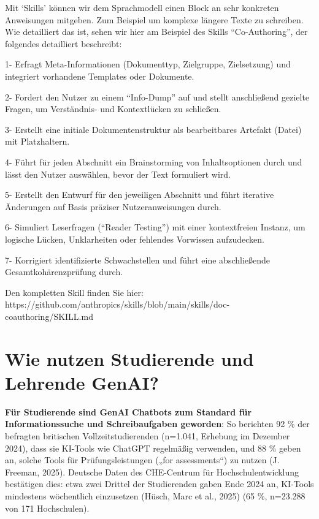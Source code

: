 \documentclass[
  ngerman,
  letterpaper,
  DIV=11]{scrreprt}
\begin{document}
\begin{tcolorbox}[enhanced jigsaw, left=2mm, bottomrule=.15mm, arc=.35mm, rightrule=.15mm, colframe=quarto-callout-tip-color-frame, coltitle=black, colback=white, toprule=.15mm, toptitle=1mm, colbacktitle=quarto-callout-tip-color!10!white, title=\textcolor{quarto-callout-tip-color}{\faLightbulb}\hspace{0.5em}{`I know Kung-Fu now' - modular Wissen hinzubuchen über `Skills'}, opacitybacktitle=0.6, leftrule=.75mm, bottomtitle=1mm, titlerule=0mm, opacityback=0, breakable]

Mit `Skills' können wir dem Sprachmodell einen Block an sehr konkreten
Anweisungen mitgeben. Zum Beispiel um komplexe längere Texte zu
schreiben. Wie detailliert das ist, sehen wir hier am Beispiel des
Skills ``Co-Authoring'', der folgendes detailliert beschreibt:

1- Erfragt Meta-Informationen (Dokumenttyp, Zielgruppe, Zielsetzung) und
integriert vorhandene Templates oder Dokumente.

2- Fordert den Nutzer zu einem ``Info-Dump'' auf und stellt anschließend
gezielte Fragen, um Verständnis- und Kontextlücken zu schließen.

3- Erstellt eine initiale Dokumentenstruktur als bearbeitbares Artefakt
(Datei) mit Platzhaltern.

4- Führt für jeden Abschnitt ein Brainstorming von Inhaltsoptionen durch
und lässt den Nutzer auswählen, bevor der Text formuliert wird.

5- Erstellt den Entwurf für den jeweiligen Abschnitt und führt iterative
Änderungen auf Basis präziser Nutzeranweisungen durch.

6- Simuliert Leserfragen (``Reader Testing'') mit einer kontextfreien
Instanz, um logische Lücken, Unklarheiten oder fehlendes Vorwissen
aufzudecken.

7- Korrigiert identifizierte Schwachstellen und führt eine abschließende
Gesamtkohärenzprüfung durch.

Den kompletten Skill finden Sie hier:
https://github.com/anthropics/skills/blob/main/skills/doc-coauthoring/SKILL.md

\end{tcolorbox}

\section{Wie nutzen Studierende und Lehrende GenAI?}\label{sec-nutzung}

\textbf{Für Studierende sind GenAI Chatbots zum Standard für
Informationssuche und Schreibaufgaben geworden}: So berichten 92 \% der
befragten britischen Vollzeitstudierenden (n=1.041, Erhebung im Dezember
2024), dass sie KI-Tools wie ChatGPT regelmäßig verwenden, und 88 \%
geben an, solche Tools für Prüfungsleistungen („for assessments``) zu
nutzen (J. Freeman, 2025). Deutsche Daten des CHE-Centrum für
Hochschulentwicklung bestätigen dies: etwa zwei Drittel der Studierenden
gaben Ende 2024 an, KI-Tools mindestens wöchentlich einzusetzen (Hüsch,
Marc et al., 2025) (65 \%, n=23.288 von 171 Hochschulen).
\end{document}
